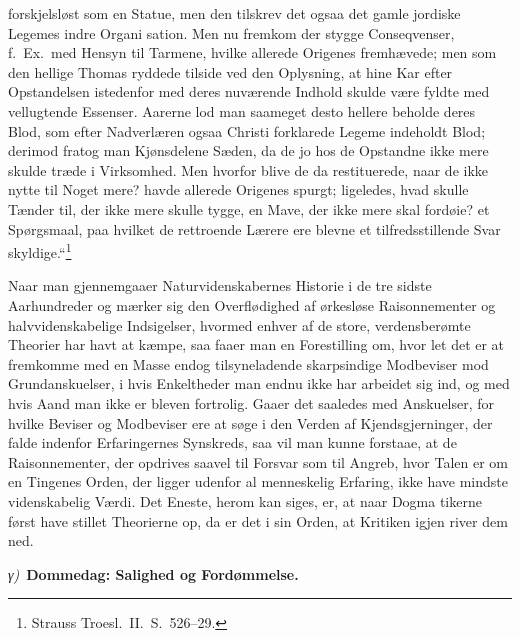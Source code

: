 \documentclass[12pt]{book}
\newcommand{\greekrun}[2]{%
  \medskip\begin{center}{\itshape #1)}\ {\bfseries #2}\end{center}\medskip}
\begin{document}
forskjelsløst som en Statue, men den tilskrev det ogsaa det gamle
jordiske Legemes indre Organi\-
sation. Men nu fremkom der stygge Conseqvenser, f.\ Ex.\ med Hensyn
til Tarmene, hvilke allerede Origenes fremhævede; men som den
hellige Thomas ryddede tilside ved den Oplysning, at hine Kar efter
Opstandelsen istedenfor med deres nuværende Indhold skulde være
fyldte med vellugtende Essenser. Aarerne lod man saameget desto
hellere beholde deres Blod, som efter Nadverlæren ogsaa Christi
forklarede Legeme indeholdt Blod; derimod fratog man Kjønsdelene
Sæden, da de jo hos de Opstandne ikke mere skulde træde i
Virksomhed. Men hvorfor blive de da restituerede, naar de ikke nytte
til Noget mere? havde allerede Origenes spurgt; ligeledes, hvad
skulle Tænder til, der ikke mere skulle tygge, en Mave, der ikke
mere skal fordøie? et Spørgsmaal, paa hvilket de rettroende Lærere
ere blevne et tilfredsstillende Svar
skyldige.“\footnote{Strauss Troesl.\ II.\ S.\ 526--29.}

Naar man gjennemgaaer Naturvidenskabernes Historie i de tre sidste
Aarhundreder og mærker sig den Overflødighed af ørkesløse
Raisonnementer og halvvidenskabelige Indsigelser, hvormed enhver af
de store, verdensberømte Theorier har havt at kæmpe, saa faaer man
en Forestilling om, hvor let det er at fremkomme med en Masse endog
tilsyneladende skarpsindige Modbeviser mod Grundanskuelser, i hvis
Enkeltheder man endnu ikke har arbeidet sig ind, og med hvis Aand
man ikke er bleven fortrolig. Gaaer det saaledes med Anskuelser, for
hvilke Beviser og Modbeviser ere at søge i den Verden af
Kjendsgjerninger, der falde indenfor Erfaringernes Synskreds, saa
vil man kunne forstaae, at de Raisonnementer, der opdrives saavel
til Forsvar som til Angreb, hvor Talen er om en Tingenes Orden, der
ligger udenfor al menneskelig Erfaring, ikke have mindste
videnskabelig Værdi. Det Eneste, herom kan siges, er, at naar Dogma\-
tikerne først have stillet Theorierne op, da er det i sin Orden, at
Kritiken igjen river dem ned.

\greekrun{γ}{Dommedag: Salighed og Fordømmelse.}
\end{document}
